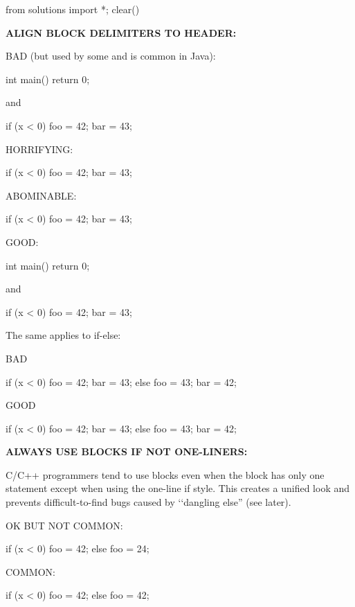\begin{python0}
from solutions import *; clear()
\end{python0}

\textbf{ALIGN BLOCK DELIMITERS TO HEADER:}

BAD (but used by some and is common in Java):
\begin{console}
int main() {
    return 0;
}  
\end{console}
and\\
\begin{console}
if (x < 0) {
   foo = 42;
   bar = 43;
} 
\end{console}

HORRIFYING:\\
\begin{console}
if (x < 0)
   {
   foo = 42;
   bar = 43;
   } 
\end{console}

ABOMINABLE:
\begin{console}
if (x < 0)
   {
        foo = 42;
        bar = 43;
   } 
\end{console}

GOOD:
\begin{console}
int main()
{
    return 0;
}  
\end{console}

and
\begin{console}
if (x < 0)
{
    foo = 42;
    bar = 43;
} 
\end{console}

The same applies to if-else:

BAD
\begin{console}
if (x < 0) {
    foo = 42;
    bar = 43;
}
else {
    foo = 43;
    bar = 42;
}
\end{console}
GOOD
\begin{console}
if (x < 0)
{  
    foo = 42;
    bar = 43;
}
else
{       
    foo = 43;
    bar = 42;
}
\end{console}

\textbf{ALWAYS USE BLOCKS IF NOT ONE-LINERS:}

C/C++ programmers tend to use blocks even when the block has only one
statement except when using the one-line if style. This creates a
unified look and prevents difficult-to-find bugs caused by \lq\lq dangling
else'' (see later).

OK BUT NOT COMMON:
\begin{console}
if (x < 0)
   foo = 42;
else
   foo = 24; 
\end{console}

COMMON:
\begin{console}
if (x < 0)
{
    foo = 42;
}
else
{
    foo = 42;
}
\end{console}
